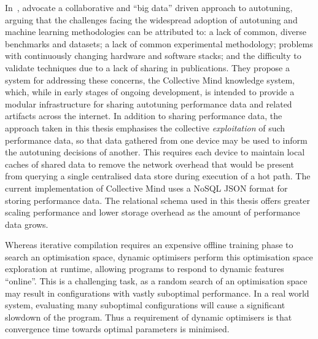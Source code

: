 %
%



In~\cite{Saclay2010,Memon2013,Fursin2014}, \citeauthor{Fursin2014}
advocate a collaborative and ``big data'' driven approach to
autotuning, arguing that the challenges facing the widespread adoption
of autotuning and machine learning methodologies can be attributed to:
a lack of common, diverse benchmarks and datasets; a lack of common
experimental methodology; problems with continuously changing hardware
and software stacks; and the difficulty to validate techniques due to
a lack of sharing in publications. They propose a system for
addressing these concerns, the Collective Mind knowledge system,
which, while in early stages of ongoing development, is intended to
provide a modular infrastructure for sharing autotuning performance
data and related artifacts across the internet. In addition to sharing
performance data, the approach taken in this thesis emphasises the
collective \emph{exploitation} of such performance data, so that data
gathered from one device may be used to inform the autotuning
decisions of another. This requires each device to maintain local
caches of shared data to remove the network overhead that would be
present from querying a single centralised data store during execution
of a hot path. The current implementation of Collective Mind uses a
NoSQL JSON format for storing performance data. The relational schema
used in this thesis offers greater scaling performance and lower
storage overhead as the amount of performance data grows.

Whereas iterative compilation requires an expensive offline training
phase to search an optimisation space, dynamic optimisers perform this
optimisation space exploration at runtime, allowing programs to
respond to dynamic features ``online''. This is a challenging task, as
a random search of an optimisation space may result in configurations
with vastly suboptimal performance. In a real world system, evaluating
many suboptimal configurations will cause a significant slowdown of
the program. Thus a requirement of dynamic optimisers is that
convergence time towards optimal parameters is minimised.

